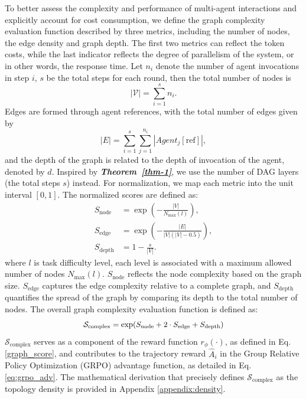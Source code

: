 \documentclass{article}
\theoremstyle{definition}
\begin{document}
To better assess the complexity and performance of multi-agent interactions and explicitly account for cost consumption, we define the graph complexity evaluation function described by three metrics, including the number of nodes, the edge density and graph depth. The first two metrics can reflect the token costs, while the last indicator reflects the degree of parallelism of the system, or in other words, the response time. Let $n_i$ denote the number of agent invocations in step $i$, $s$ be the total steps for each round, then the 
total number of nodes is
\begin{equation}\label{eq:num_of_nodes}
|\mathcal{V}| = \sum_{i=1}^{s} n_i.
\end{equation}
Edges are formed through agent references, with the total number of edges given by
\begin{equation}\label{eq:num_of_edges}
|E| = \sum_{i=1}^{s} \sum_{j=1}^{n_i} |Agent_j[\text{ref}]|,
\end{equation} and the depth of the graph is related to the depth of invocation of the agent, denoted by $d$. Inspired by \textbf{\textit{Theorem~\ref{thm-1}}}, we use the number of DAG layers (the total steps $s$) instead. For normalization, we map each metric into the unit interval $[0,1]$. 
The normalized scores are defined as: 
\begin{equation}
\begin{aligned}
S_{\text{node}}
&= \exp\!\left(-\tfrac{|V|}{N_{\max}(l)}\right), \\
S_{\text{edge}}
&= \exp\!\left(-\tfrac{|E|}{|V|(|V|-0.5)}\right), \\
S_{\text{depth}}
&= 1 - \tfrac{s}{|V|}.
\end{aligned}
\end{equation}
where \( l \) is task difficulty level, each level is associated with a maximum allowed number of nodes $N_{\max}(l)$. $S_{\text{node}}$ reflects the node complexity based on the graph size. $S_{\text{edge}}$ captures the edge complexity relative to a complete graph, and $S_{\text{depth}}$ quantifies the spread of the graph by comparing its depth to the total number of nodes. The overall graph complexity evaluation function is defined as:
\begin{equation}
\label{eq:graph_complexity}
\scalebox{0.95}{$
\mathcal{S}_{\text{complex}}
=  \exp\!\left(
 S_{\text{node}}
+ 2 \cdot S_{\text{edge}}
+ S_{\text{depth}}
\right)
$}
\end{equation}
$\mathcal{S}_{\text{complex}}$ serves as a component of the reward function $r_{\phi}(\cdot)$, as defined in Eq.\ref{graph_score}, and contributes to the trajectory reward $\hat{A}_i$ in the Group Relative Policy Optimization (GRPO) advantage function, as detailed in Eq.\ref{eq:grpo_adv}.
The mathematical derivation that precisely defines $\mathcal{S}_{\text{complex}}$ as the topology density is provided in Appendix \ref{appendix:density}.
\end{document}
